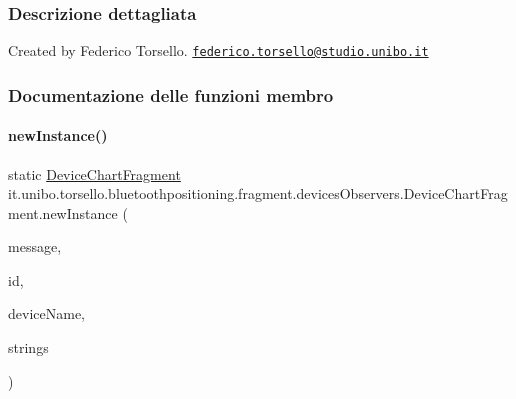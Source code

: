 \subsubsection{Descrizione dettagliata}
Created by Federico Torsello. \href{mailto:federico.torsello@studio.unibo.it}{\tt federico.\+torsello@studio.\+unibo.\+it} 

\subsubsection{Documentazione delle funzioni membro}
\hypertarget{classit_1_1unibo_1_1torsello_1_1bluetoothpositioning_1_1fragment_1_1devicesObservers_1_1DeviceChartFragment_accfb6a3ab4e807b9070811c0f89653a1_accfb6a3ab4e807b9070811c0f89653a1}{}\label{classit_1_1unibo_1_1torsello_1_1bluetoothpositioning_1_1fragment_1_1devicesObservers_1_1DeviceChartFragment_accfb6a3ab4e807b9070811c0f89653a1_accfb6a3ab4e807b9070811c0f89653a1} 
\paragraph{\texorpdfstring{new\+Instance()}{newInstance()}}
{\footnotesize\ttfamily static \hyperlink{classit_1_1unibo_1_1torsello_1_1bluetoothpositioning_1_1fragment_1_1devicesObservers_1_1DeviceChartFragment}{Device\+Chart\+Fragment} it.\+unibo.\+torsello.\+bluetoothpositioning.\+fragment.\+devices\+Observers.\+Device\+Chart\+Fragment.\+new\+Instance (\begin{DoxyParamCaption}\item[{String}]{message,  }\item[{int}]{id,  }\item[{String}]{device\+Name,  }\item[{Array\+List$<$ String $>$}]{strings }\end{DoxyParamCaption})\hspace{0.3cm}{\ttfamily [static]}}



